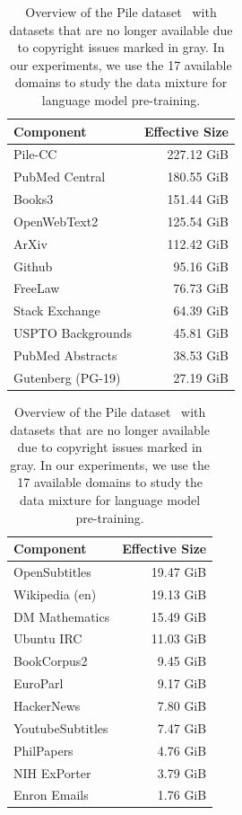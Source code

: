 \begin{table}[tb]
\centering
\small
\caption{Overview of the Pile dataset~\citep{the_pile_corpus} with datasets that are no longer available due to copyright issues marked in gray. In our experiments, we use the 17 available domains to study the data mixture for language model pre-training.}
\vspace{1mm}
\label{table:pile_overview}
\begin{tabular}{lr}
\toprule
\textbf{Component} & \textbf{Effective Size} \\
\midrule
Pile-CC  & 227.12 GiB  \\
PubMed Central & 180.55 GiB \\
\rowcolor{gray!25} Books3 & 151.44 GiB \\
\rowcolor{gray!25} OpenWebText2 & 125.54 GiB\\
ArXiv & 112.42 GiB \\
Github & 95.16 GiB\\
FreeLaw & 76.73 GiB \\
Stack Exchange & 64.39 GiB \\
USPTO Backgrounds & 45.81 GiB \\
PubMed Abstracts & 38.53 GiB \\
Gutenberg (PG-19) & 27.19 GiB \\
\bottomrule
\end{tabular}
\hspace{5mm}
\begin{tabular}{lr}
\toprule
\textbf{Component} & \textbf{Effective Size} \\
\midrule
\rowcolor{gray!25} OpenSubtitles & 19.47 GiB \\
Wikipedia (en) & 19.13 GiB \\
DM Mathematics  & 15.49 GiB \\
Ubuntu IRC & 11.03 GiB \\
\rowcolor{gray!25} BookCorpus2 & 9.45 GiB \\
EuroParl & 9.17 GiB \\
HackerNews & 7.80 GiB \\
\rowcolor{gray!25} YoutubeSubtitles & 7.47 GiB \\
PhilPapers & 4.76 GiB  \\
NIH ExPorter & 3.79 GiB  \\
Enron Emails & 1.76 GiB \\
\bottomrule
\end{tabular}
\vspace{-1mm}
\end{table}

